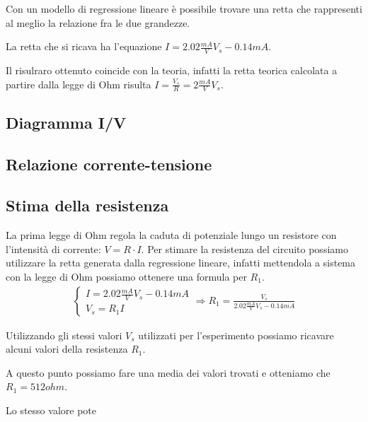 \documentclass{article}
\begin{document}
Con un modello di regressione lineare è possibile trovare una retta che rappresenti al meglio la relazione fra le due grandezze.

La retta che si ricava ha l'equazione \(I = 2.02 \frac{mA}{V} V_s - 0.14 mA\).

Il risulraro ottenuto coincide con la teoria, infatti la retta teorica calcolata a partire dalla legge di Ohm risulta \(I = \frac{V_s}{R} = 2 \frac{mA}{V} V_s\).

\subsection{Diagramma I/V}

\subsection{Relazione corrente-tensione}

\subsection{Stima della resistenza}
La prima legge di Ohm regola la caduta di potenziale lungo un resistore con l'intensità di corrente:
\(V=R \cdot I\).
Per stimare la resistenza del circuito possiamo utilizzare la retta generata dalla regressione lineare, infatti mettendola a sistema con la legge di Ohm possiamo ottenere una formula per \(R_1\).
\[
\begin{aligned}
\begin{cases}
    I=2.02 \frac{mA}{V} V_s -0.14 mA \\
    V_s= R_1 I
\end{cases}
\Rightarrow R_1 = \frac{V_s}{2.02 \frac{mA}{V}V_s - 0.14 mA}
\end{aligned}
\]


Utilizzando gli stessi valori \(V_s\) utilizzati per l'esperimento possiamo ricavare alcuni valori della resistenza \(R_1\).

A questo punto possiamo fare una media dei valori trovati e otteniamo che \(R_1 = 512 ohm\).

Lo stesso valore pote
\end{document}
